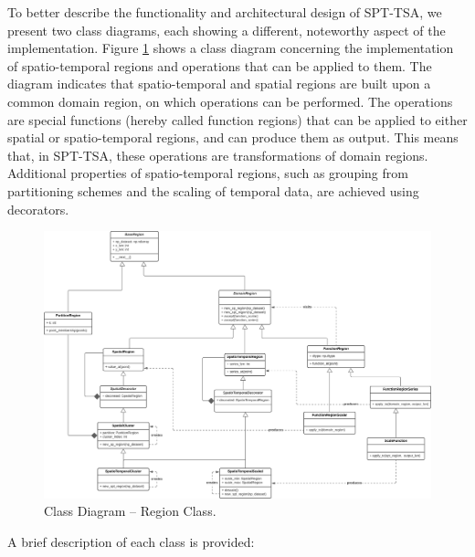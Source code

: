 To better describe the functionality and architectural design of SPT-TSA, we present two class diagrams, each showing a different, noteworthy aspect of the implementation. Figure \ref{Fig:DiagramClasess-Region} shows a class diagram concerning the implementation of spatio-temporal regions and operations that can be applied to them. The diagram indicates that spatio-temporal and spatial regions are built upon a common domain region, on which operations can be performed. The operations are special functions (hereby called function regions) that can be applied to either spatial or spatio-temporal regions, and can produce them as output. This means that, in SPT-TSA, these operations are transformations of domain regions. Additional properties of spatio-temporal regions, such as grouping from partitioning schemes and the scaling of temporal data, are achieved using decorators.

\begin{figure}[tp]
	\centering
	\includegraphics[scale=0.40, angle=90]{../Figures/SPT-TSA-RegionClasses}
	\caption{Class Diagram -- Region Class.}	
	\label{Fig:DiagramClasess-Region}	 		
\end{figure}

A brief description of each class is provided:

